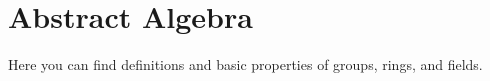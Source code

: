 \chapter{Abstract Algebra}
Here you can find definitions and basic properties of groups, rings, and fields.



